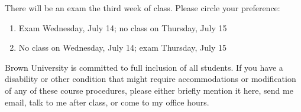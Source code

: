 \documentclass[11pt]{article}
\begin{document}
There will be an exam the third week of class. Please circle your preference:
\begin{enumerate}
\item Exam Wednesday, July 14; no class on Thursday, July 15
\item No class on Wednesday, July 14; exam Thursday, July 15
\end{enumerate}

Brown University is committed to full inclusion of all students.  If you have a disability or other condition that might require accommodations or modification of any of these course procedures, please either briefly mention it here, send me email, talk to me after class, or come to my office hours.
\end{document}
